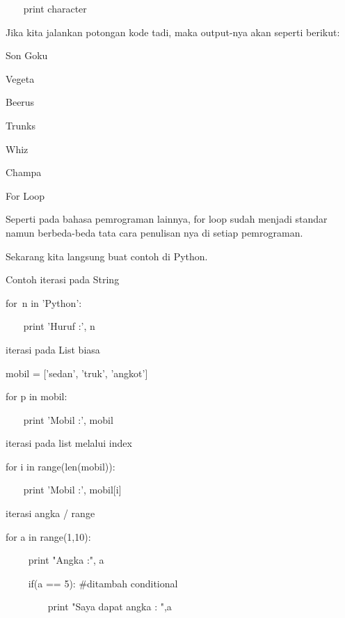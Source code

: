 ~~~ print character \par
\vspace{12pt}
Jika kita jalankan potongan kode tadi, maka $  $output-nya akan seperti berikut: \par
\vspace{12pt}
Son Goku \par
Vegeta \par
Beerus \par
Trunks \par
Whiz \par
Champa \par
For Loop \par
Seperti pada bahasa pemrograman lainnya, for loop sudah menjadi standar namun berbeda-beda tata cara penulisan nya di setiap pemrograman. \par
\vspace{12pt}
Sekarang kita langsung buat contoh di Python. $  $ \par
\vspace{12pt}
\vspace{12pt}
Contoh iterasi pada String  \par
\vspace{12pt}
for~n in 'Python':   \par
~~~ print 'Huruf :', n \par
\vspace{12pt}
  \par
iterasi pada List biasa \par
\vspace{12pt}
mobil = ['sedan', 'truk', 'angkot']  \par
for p in mobil: \par
~~~ print 'Mobil :', mobil \par
\vspace{12pt}
\vspace{12pt}
iterasi pada list melalui index \par
for i in range(len(mobil)): \par
~~~ print 'Mobil :', mobil[i] \par
\vspace{12pt}
iterasi angka / range \par
\vspace{12pt}
for a in range(1,10): \par
~~~~ print "Angka :", a \par
~~~~ if(a == 5):  $  \#  $ditambah conditional \par
~~~~~~~~ print "Saya dapat angka : ",a \par
